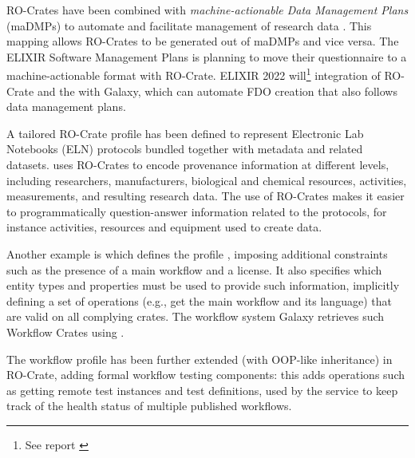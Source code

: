 RO-Crates have been combined with \emph{machine-actionable Data
Management Plans} (maDMPs) to automate and facilitate management of
research data \cite{Miksa 2020}. This mapping allows RO-Crates to be generated out of maDMPs
and vice versa. The ELIXIR Software Management Plans
\cite{Alves 2021} is
planning to move their questionnaire to a machine-actionable format with
RO-Crate. ELIXIR 
2022 will\footnote{See report \cite{Eguinoa 2023}}
integration of RO-Crate and the  
\cite{Pergl 2019} with Galaxy, which can automate FDO creation that also follows
data management plans.

A tailored RO-Crate profile has been defined to represent Electronic Lab
Notebooks (ELN) protocols bundled together with metadata and related
datasets. \cite{Schröder 2022} uses RO-Crates to encode provenance information at different
levels, including researchers, manufacturers, biological and chemical
resources, activities, measurements, and resulting research data. The
use of RO-Crates makes it easier to programmatically question-answer
information related to the protocols, for instance activities, resources
and equipment used to create data.

Another example is 
\cite{Goble 2021} which
defines the
 profile
\cite{Bacall 2022}, imposing additional constraints such as the presence of a main
workflow and a license. It also specifies which entity types and
properties must be used to provide such information, implicitly defining
a set of operations (e.g., get the main workflow and its language) that
are valid on all complying crates. The workflow system Galaxy
\cite{Galaxy 2022} retrieves
such Workflow Crates using
.

The workflow profile has been further extended (with OOP-like
inheritance) in
RO-Crate, adding formal workflow testing components: this adds
operations such as getting remote test instances and test definitions,
used by the  service to
keep track of the health status of multiple published workflows.

